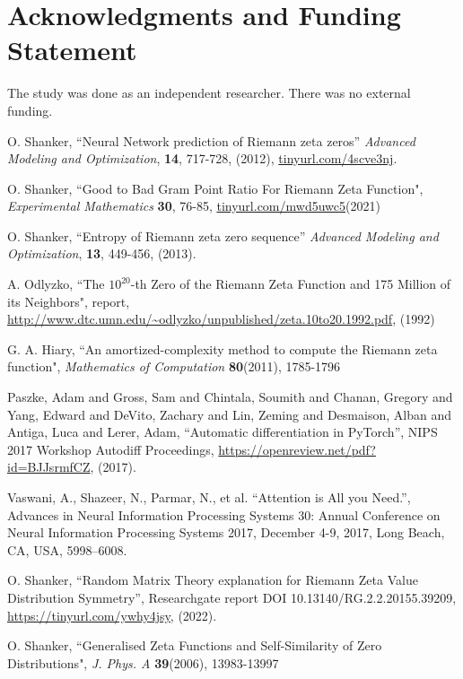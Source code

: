 \documentclass[twoside]{article}
\begin{document}
\section*{Acknowledgments and Funding Statement}

 The study was done as an independent researcher. There was no
external funding.




\begin{thebibliography}{10}

 O. Shanker, ``Neural Network prediction of Riemann zeta zeros''
{\it Advanced Modeling and Optimization}, {\bf 14}, 717-728, (2012), \url{tinyurl.com/4scve3nj}.


 O. Shanker, 
``Good to Bad Gram Point Ratio For Riemann Zeta Function",
{\it Experimental Mathematics} {\bf 30}, 76-85,
\url{tinyurl.com/mwd5uwc5}(2021)

 O. Shanker, ``Entropy of Riemann zeta zero sequence''
{\it Advanced Modeling and Optimization}, {\bf 13}, 449-456, (2013). 

  A. Odlyzko,
``The $10^{20}$-th Zero of the Riemann Zeta
Function and 175 Million of its Neighbors", report,
\url{http://www.dtc.umn.edu/~odlyzko/unpublished/zeta.10to20.1992.pdf}, (1992)

 G. A. Hiary,
``An amortized-complexity method to compute the Riemann zeta function", 
{\it Mathematics of Computation} {\bf80}(2011), 1785-1796


 Paszke, Adam and Gross, Sam and Chintala, Soumith and Chanan, Gregory and Yang, Edward and DeVito, Zachary and Lin, Zeming and Desmaison, Alban and Antiga, Luca and Lerer, Adam, 
``Automatic differentiation in PyTorch'',
 NIPS 2017 Workshop Autodiff Proceedings,
\url{https://openreview.net/pdf?id=BJJsrmfCZ}, 
(2017). 

 Vaswani, A., Shazeer, N., Parmar, N., et al. 
``Attention is All you Need.'', 
Advances in Neural Information Processing Systems 30: Annual Conference                    on Neural Information Processing Systems 2017, December 4-9, 2017,  Long Beach, CA, USA, 5998--6008.

 O. Shanker, 
``Random Matrix Theory explanation for Riemann Zeta Value Distribution Symmetry'',
 Researchgate report DOI 10.13140/RG.2.2.20155.39209,
\url{https://tinyurl.com/ywhy4jsy}, 
(2022). 


 O. Shanker, 
``Generalised Zeta Functions and Self-Similarity of Zero Distributions",
{\it J.  Phys. A} {\bf39}(2006), 13983-13997


\end{thebibliography}
\end{document}
